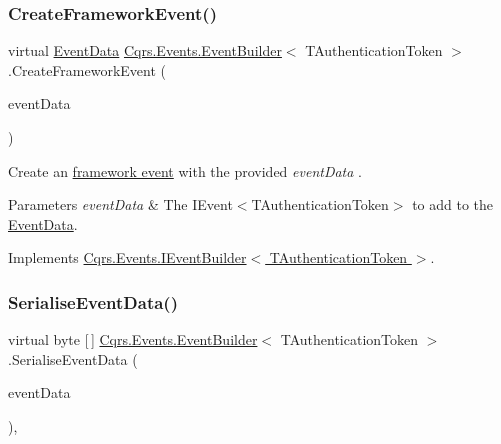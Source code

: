 \subsubsection{\texorpdfstring{Create\+Framework\+Event()}{CreateFrameworkEvent()}\hspace{0.1cm}{\footnotesize\ttfamily [2/2]}}
{\footnotesize\ttfamily virtual \hyperlink{classCqrs_1_1Events_1_1EventData}{Event\+Data} \hyperlink{classCqrs_1_1Events_1_1EventBuilder}{Cqrs.\+Events.\+Event\+Builder}$<$ T\+Authentication\+Token $>$.Create\+Framework\+Event (\begin{DoxyParamCaption}\item[{\hyperlink{interfaceCqrs_1_1Events_1_1IEvent}{I\+Event}$<$ T\+Authentication\+Token $>$}]{event\+Data }\end{DoxyParamCaption})\hspace{0.3cm}{\ttfamily [virtual]}}



Create an \hyperlink{}{framework event} with the provided {\itshape event\+Data} . 


\begin{DoxyParams}{Parameters}
{\em event\+Data} & The I\+Event$<$\+T\+Authentication\+Token$>$ to add to the \hyperlink{classCqrs_1_1Events_1_1EventData}{Event\+Data}.\\
\hline
\end{DoxyParams}


Implements \hyperlink{interfaceCqrs_1_1Events_1_1IEventBuilder_a3c0cb2db87e496ad64f481a6cce2c79d_a3c0cb2db87e496ad64f481a6cce2c79d}{Cqrs.\+Events.\+I\+Event\+Builder$<$ T\+Authentication\+Token $>$}.

\mbox{\label{classCqrs_1_1Events_1_1EventBuilder_a5392c1e86ea54fb96ee7af3a57f9af5a_a5392c1e86ea54fb96ee7af3a57f9af5a}} 
\subsubsection{\texorpdfstring{Serialise\+Event\+Data()}{SerialiseEventData()}}
{\footnotesize\ttfamily virtual byte \mbox{[}$\,$\mbox{]} \hyperlink{classCqrs_1_1Events_1_1EventBuilder}{Cqrs.\+Events.\+Event\+Builder}$<$ T\+Authentication\+Token $>$.Serialise\+Event\+Data (\begin{DoxyParamCaption}\item[{\hyperlink{interfaceCqrs_1_1Events_1_1IEvent}{I\+Event}$<$ T\+Authentication\+Token $>$}]{event\+Data }\end{DoxyParamCaption})\hspace{0.3cm}{\ttfamily [protected]}, {\ttfamily [virtual]}}



